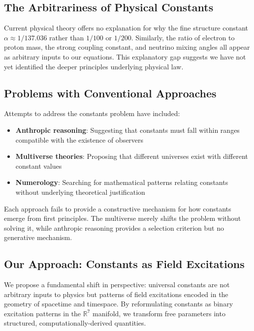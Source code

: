 \documentclass{article}
\begin{document}
\subsection{The Arbitrariness of Physical Constants}

Current physical theory offers no explanation for why the fine structure constant $\alpha \approx 1/137.036$ rather than $1/100$ or $1/200$. Similarly, the ratio of electron to proton mass, the strong coupling constant, and neutrino mixing angles all appear as arbitrary inputs to our equations. This explanatory gap suggests we have not yet identified the deeper principles underlying physical law.

\subsection{Problems with Conventional Approaches}

Attempts to address the constants problem have included:

\begin{itemize}
    \item \textbf{Anthropic reasoning}: Suggesting that constants must fall within ranges compatible with the existence of observers
    \item \textbf{Multiverse theories}: Proposing that different universes exist with different constant values
    \item \textbf{Numerology}: Searching for mathematical patterns relating constants without underlying theoretical justification
\end{itemize}

Each approach fails to provide a constructive mechanism for how constants emerge from first principles. The multiverse merely shifts the problem without solving it, while anthropic reasoning provides a selection criterion but no generative mechanism.

\subsection{Our Approach: Constants as Field Excitations}

We propose a fundamental shift in perspective: universal constants are not arbitrary inputs to physics but patterns of field excitations encoded in the geometry of spacetime and timespace. By reformulating constants as binary excitation patterns in the $\mathbb{R}^7$ manifold, we transform free parameters into structured, computationally-derived quantities.
\end{document}
